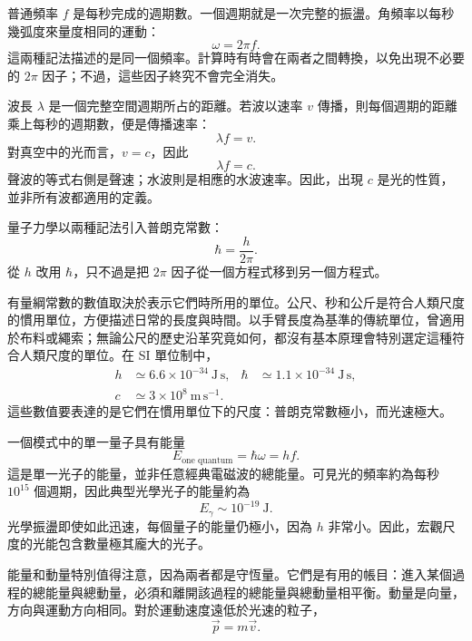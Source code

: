 普通頻率 \(f\) 是每秒完成的週期數。一個週期就是一次完整的振盪。角頻率以每秒幾弧度來量度相同的運動：
\begin{equation}
\omega=2\pi f.
\end{equation}
這兩種記法描述的是同一個頻率。計算時有時會在兩者之間轉換，以免出現不必要的 \(2\pi\) 因子；不過，這些因子終究不會完全消失。

波長 \(\lambda\) 是一個完整空間週期所占的距離。若波以速率 \(v\) 傳播，則每個週期的距離乘上每秒的週期數，便是傳播速率：
\begin{equation}
\lambda f=v.
\end{equation}
對真空中的光而言，\(v=c\)，因此
\begin{equation}
\lambda f=c.
\end{equation}
聲波的等式右側是聲速；水波則是相應的水波速率。因此，出現 \(c\) 是光的性質，並非所有波都適用的定義。

量子力學以兩種記法引入普朗克常數：
\begin{equation}
\hbar=\frac{h}{2\pi}.
\end{equation}
從 \(h\) 改用 \(\hbar\)，只不過是把 \(2\pi\) 因子從一個方程式移到另一個方程式。

有量綱常數的數值取決於表示它們時所用的單位。公尺、秒和公斤是符合人類尺度的慣用單位，方便描述日常的長度與時間。以手臂長度為基準的傳統單位，曾適用於布料或繩索；無論公尺的歷史沿革究竟如何，都沒有基本原理會特別選定這種符合人類尺度的單位。在 SI 單位制中，
\begin{equation}
\begin{aligned}
h &\simeq 6.6\times10^{-34}\ \mathrm{J\,s},
&\hbar &\simeq 1.1\times10^{-34}\ \mathrm{J\,s},\\
c &\simeq 3\times10^8\ \mathrm{m\,s^{-1}}.
\end{aligned}
\end{equation}
這些數值要表達的是它們在慣用單位下的尺度：普朗克常數極小，而光速極大。

一個模式中的單一量子具有能量
\begin{equation}
E_{\text{one quantum}}=\hbar\omega=hf.
\end{equation}
這是單一光子的能量，並非任意經典電磁波的總能量。可見光的頻率約為每秒 \(10^{15}\) 個週期，因此典型光學光子的能量約為
\begin{equation}
E_\gamma\sim 10^{-19}\ \mathrm{J}.
\end{equation}
光學振盪即使如此迅速，每個量子的能量仍極小，因為 \(h\) 非常小。因此，宏觀尺度的光能包含數量極其龐大的光子。

能量和動量特別值得注意，因為兩者都是守恆量。它們是有用的帳目：進入某個過程的總能量與總動量，必須和離開該過程的總能量與總動量相平衡。動量是向量，方向與運動方向相同。對於運動速度遠低於光速的粒子，
\begin{equation}
\vec p=m\vec v.
\end{equation}

